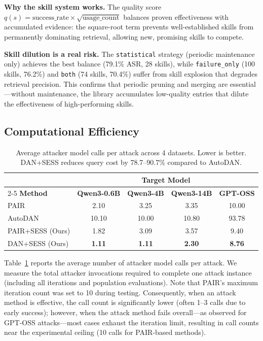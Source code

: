 \documentclass{article} %
\begin{document}
\textbf{Why the skill system works.} The quality score $q(s) = \text{success\_rate} \times \sqrt{\text{usage\_count}}$ balances proven effectiveness with accumulated evidence: the square-root term prevents well-established skills from permanently dominating retrieval, allowing new, promising skills to compete.

\textbf{Skill dilution is a real risk.} The \texttt{statistical} strategy (periodic maintenance only) achieves the best balance (79.1\% ASR, 28 skills), while \texttt{failure\_only} (100 skills, 76.2\%) and \texttt{both} (74 skills, 70.4\%) suffer from skill explosion that degrades retrieval precision. This confirms that periodic pruning and merging are essential---without maintenance, the library accumulates low-quality entries that dilute the effectiveness of high-performing skills.

\subsection{Computational Efficiency}

\begin{table}[t]
\centering
\caption{Average attacker model calls per attack across 4 datasets. Lower is better. DAN+SESS reduces query cost by 78.7--90.7\% compared to AutoDAN.}
\label{tab:efficiency}
\footnotesize
\setlength{\tabcolsep}{0.5pt}
\begin{tabular}{lcccc}
\toprule
& \multicolumn{4}{c}{\textbf{Target Model}} \\
\cmidrule(lr){2-5}
\textbf{Method} & \textbf{Qwen3-0.6B} & \textbf{Qwen3-4B} & \textbf{Qwen3-14B} & \textbf{GPT-OSS} \\
\midrule
PAIR & 2.10 & 3.25 & 3.35 & 10.00 \\
AutoDAN & 10.10 & 10.00 & 10.80 & 93.78 \\
\midrule
PAIR+SESS (Ours) & 1.82 & 3.09 & 3.57 & 9.40 \\
DAN+SESS (Ours) & \textbf{1.11} & \textbf{1.11} & \textbf{2.30} & \textbf{8.76} \\
\bottomrule
\end{tabular}
\end{table}

Table~\ref{tab:efficiency} reports the average number of attacker model calls per attack. We measure the total attacker invocations required to complete one attack instance (including all iterations and population evaluations). Note that PAIR's maximum iteration count was set to 10 during testing. Consequently, when an attack method is effective, the call count is significantly lower (often 1--3 calls due to early success); however, when the attack method fails overall---as observed for GPT-OSS attacks---most cases exhaust the iteration limit, resulting in call counts near the experimental ceiling (10 calls for PAIR-based methods).
\end{document}
